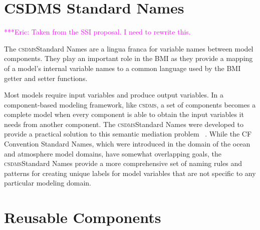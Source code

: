 \documentclass[11pt, oneside]{amsart}
\newcommand{\huttonnote}[1]{ {\textcolor{magenta}    { ***Eric:      #1 }}}
\DeclareRobustCommand{\csdms}{\textsc{csdms}}
\begin{document}


\section{CSDMS Standard Names}

\huttonnote{Taken from the SSI proposal. I need to rewrite this.}

The \csdms Standard Names are a lingua franca for variable names between model
components. They play an important role in the BMI as they provide a mapping of
a model's internal variable names to a common language used by the BMI getter
and setter functions.

Most models require input variables and produce output variables. In a
component-based modeling framework, like \csdms, a set of components becomes a
complete model when every component is able to obtain the input variables it
needs from another component. The \csdms Standard Names were developed to
provide a practical solution to this semantic mediation problem
~\cite{peckham2012component, syvitski2014plug}.
While the CF Convention Standard Names, which were
introduced in the domain of the ocean and atmosphere model domains, have
somewhat overlapping goals, the \csdms Standard Names provide a more
comprehensive set of naming rules and patterns for creating unique labels for
model variables that are not specific to any particular modeling domain.




\section{Reusable Components}
\end{document}
